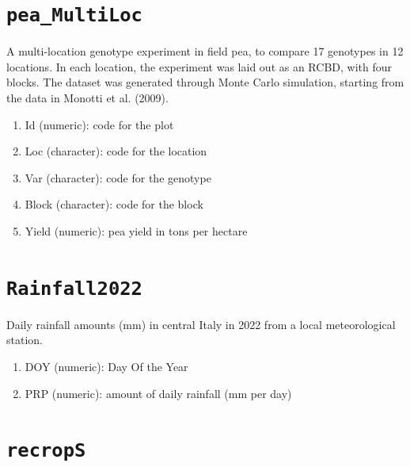 \documentclass[
  letterpaper,
  DIV=11,
  numbers=noendperiod]{scrreprt}
\providecommand{\tightlist}{%
  \setlength{\itemsep}{0pt}\setlength{\parskip}{0pt}}
\begin{document}
\section*{\texorpdfstring{\texttt{pea\_MultiLoc}}{pea\_MultiLoc}}\label{pea_multiloc}


A multi-location genotype experiment in field pea, to compare 17
genotypes in 12 locations. In each location, the experiment was laid out
as an RCBD, with four blocks. The dataset was generated through Monte
Carlo simulation, starting from the data in Monotti et al. (2009).

\begin{enumerate}
\def\labelenumi{\arabic{enumi}.}
\tightlist
\item
  Id (numeric): code for the plot
\item
  Loc (character): code for the location
\item
  Var (character): code for the genotype
\item
  Block (character): code for the block
\item
  Yield (numeric): pea yield in tons per hectare
\end{enumerate}

\section*{\texorpdfstring{\texttt{Rainfall2022}}{Rainfall2022}}\label{rainfall2022}


Daily rainfall amounts (mm) in central Italy in 2022 from a local
meteorological station.

\begin{enumerate}
\def\labelenumi{\arabic{enumi}.}
\tightlist
\item
  DOY (numeric): Day Of the Year
\item
  PRP (numeric): amount of daily rainfall (mm per day)
\end{enumerate}

\section*{\texorpdfstring{\texttt{recropS}}{recropS}}\label{recrops}
\end{document}
